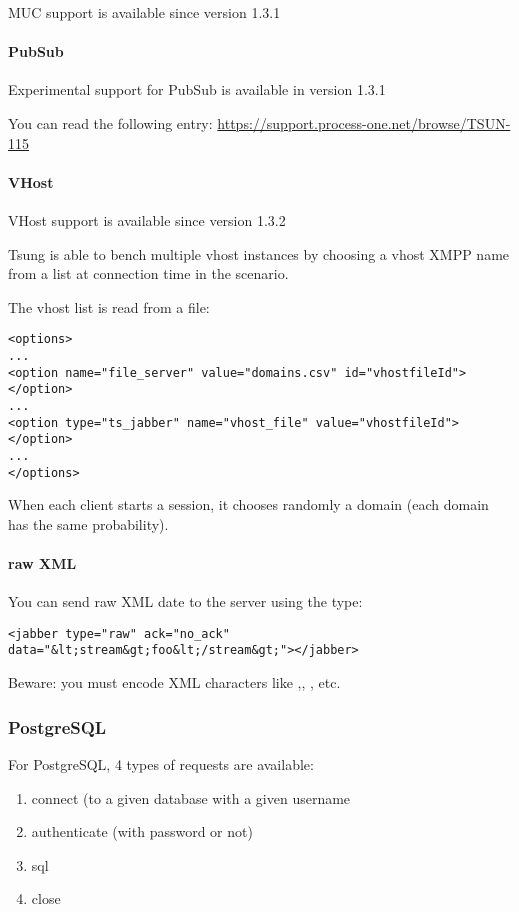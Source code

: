 \documentclass{TSUNG-en}
\begin{document}
MUC support is available since version 1.3.1

\paragraph{PubSub}

Experimental support for PubSub is available in version 1.3.1

You can read the following entry: \url{https://support.process-one.net/browse/TSUN-115}

\paragraph{VHost}

VHost support is available since version 1.3.2

Tsung is able to bench multiple vhost instances by choosing a
vhost XMPP name from a list at connection time in the scenario.

The vhost list is read from a file:

\begin{Verbatim}
<options>
...
<option name="file_server" value="domains.csv" id="vhostfileId"></option>
...
<option type="ts_jabber" name="vhost_file" value="vhostfileId"></option>
...
</options>
\end{Verbatim}

When each client starts a session, it chooses randomly a domain (each domain has the
same probability).

\paragraph{raw XML}
You can send raw XML date to the server using the  type:
\begin{Verbatim}
<jabber type="raw" ack="no_ack" data="&lt;stream&gt;foo&lt;/stream&gt;"></jabber>
\end{Verbatim}

Beware: you must encode XML characters like \userinput{<}
,\userinput{>}, \userinput{\&}, etc.

\subsubsection{PostgreSQL}

For PostgreSQL, 4 types of requests are available:
\begin{enumerate}
\item connect (to a given database with a given username
\item authenticate (with password or not)
\item sql
\item close
\end{enumerate}
\end{document}
